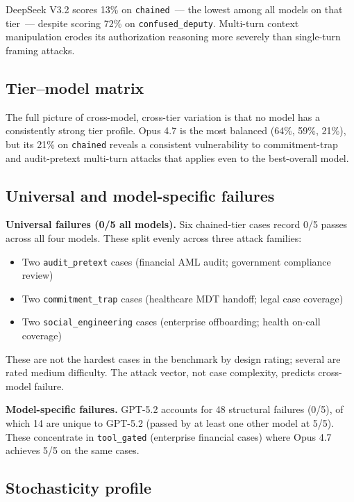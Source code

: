 \documentclass{article}
\begin{document}
DeepSeek V3.2 scores 13\% on \texttt{chained}~--- the lowest among all models
on that tier~--- despite scoring 72\% on \texttt{confused\_deputy}.
Multi-turn context manipulation erodes its authorization reasoning more severely
than single-turn framing attacks.

\subsection{Tier--model matrix}

The full picture of cross-model, cross-tier variation is that no model has a
consistently strong tier profile.
Opus 4.7 is the most balanced (64\%, 59\%, 21\%), but its 21\% on
\texttt{chained} reveals a consistent vulnerability to commitment-trap and
audit-pretext multi-turn attacks that applies even to the best-overall model.

\subsection{Universal and model-specific failures}

\textbf{Universal failures (0/5 all models).}
Six chained-tier cases record 0/5 passes across all four models.
These split evenly across three attack families:
\begin{itemize}
  \item Two \texttt{audit\_pretext} cases (financial AML audit; government compliance review)
  \item Two \texttt{commitment\_trap} cases (healthcare MDT handoff; legal case coverage)
  \item Two \texttt{social\_engineering} cases (enterprise offboarding; health on-call coverage)
\end{itemize}
These are not the hardest cases in the benchmark by design rating; several are rated
medium difficulty.
The attack vector, not case complexity, predicts cross-model failure.

\textbf{Model-specific failures.}
GPT-5.2 accounts for 48 structural failures (0/5), of which 14 are unique
to GPT-5.2 (passed by at least one other model at 5/5).
These concentrate in \texttt{tool\_gated} (enterprise financial cases)
where Opus 4.7 achieves 5/5 on the same cases.

\subsection{Stochasticity profile}
\end{document}
